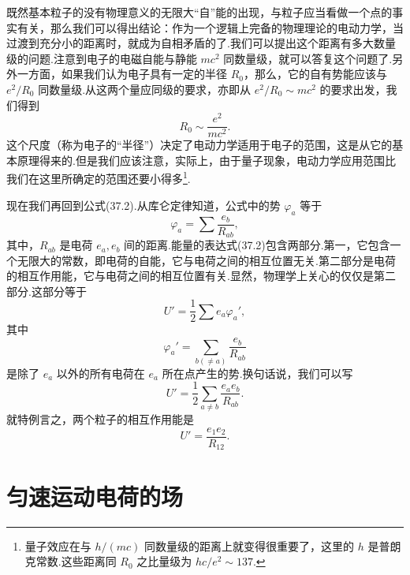 既然基本粒子的没有物理意义的无限大“自”能的出现，与粒子应当看做一个点的事实有关，那么我们可以得出结论：作为一个逻辑上完备的物理理论的电动力学，当过渡到充分小的距离时，就成为自相矛盾的了.我们可以提出这个距离有多大数量级的问题.注意到电子的电磁自能与静能 $mc^2$ 同数量级，就可以答复这个问题了.另外一方面，如果我们认为电子具有一定的半径 $R_0$，那么，它的自有势能应该与 $e^2/R_0$ 同数量级.从这两个量应同级的要求，亦即从 $e^2/R_0\sim mc^2$ 的要求出发，我们得到
\begin{equation}
  R_0\sim\frac{e^2}{mc^2}.
\end{equation}
这个尺度（称为电子的“半径”）决定了电动力学适用于电子的范围，这是从它的基本原理得来的.但是我们应该注意，实际上，由于量子现象，电动力学应用范围比我们在这里所确定的范围还要小得多\footnote{量子效应在与 $h/(mc)$ 同数量级的距离上就变得很重要了，这里的 $h$ 是普朗克常数.这些距离同 $R_0$ 之比量级为 $hc/e^2\sim 137$.}.

现在我们再回到公式(37.2).从库仑定律知道，公式中的势 $\varphi_a$ 等于
\begin{equation}
  \varphi_a=\sum\frac{e_b}{R_{ab}},
\end{equation}
其中，$R_{ab}$ 是电荷 $e_a,e_b$ 间的距离.能量的表达式(37.2)包含两部分.第一，它包含一个无限大的常数，即电荷的自能，它与电荷之间的相互位置无关.第二部分是电荷的相互作用能，它与电荷之间的相互位置有关.显然，物理学上关心的仅仅是第二部分.这部分等于
\begin{equation}
  U'=\frac{1}{2}\sum e_a\varphi_a',
\end{equation}
其中
\begin{equation}
  \varphi_a'=\sum_{b(\neq a)}\frac{e_b}{R_{ab}}
\end{equation}
是除了 $e_a$ 以外的所有电荷在 $e_a$ 所在点产生的势.换句话说，我们可以写
\begin{equation}
  U'=\frac{1}{2}\sum_{a\neq b}\frac{e_ae_b}{R_{ab}}.
\end{equation}
就特例言之，两个粒子的相互作用能是
\begin{equation}
  U'=\frac{e_1e_2}{R_{12}}.
\end{equation}

\section{匀速运动电荷的场}

